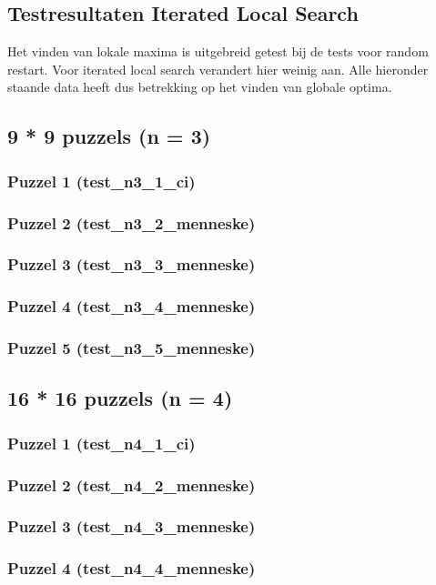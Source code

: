 \documentclass[]{report}
\begin{document}
\begin{appendices}
\chapter{Testresultaten Iterated Local Search}
Het vinden van lokale maxima is uitgebreid getest bij de tests voor random restart. Voor iterated local search verandert hier weinig aan. Alle hieronder staande data heeft dus betrekking op het vinden van globale optima.
\section{9 * 9 puzzels (n = 3)}
\subsection{Puzzel 1 (test\_n3\_1\_ci)}

\subsection{Puzzel 2 (test\_n3\_2\_menneske)}
\subsection{Puzzel 3 (test\_n3\_3\_menneske)}
\subsection{Puzzel 4 (test\_n3\_4\_menneske)}
\subsection{Puzzel 5 (test\_n3\_5\_menneske)}
\section{16 * 16 puzzels (n = 4)}
\subsection{Puzzel 1 (test\_n4\_1\_ci)}

\subsection{Puzzel 2 (test\_n4\_2\_menneske)}
\subsection{Puzzel 3 (test\_n4\_3\_menneske)}
\subsection{Puzzel 4 (test\_n4\_4\_menneske)}

\end{appendices}
\end{document}
